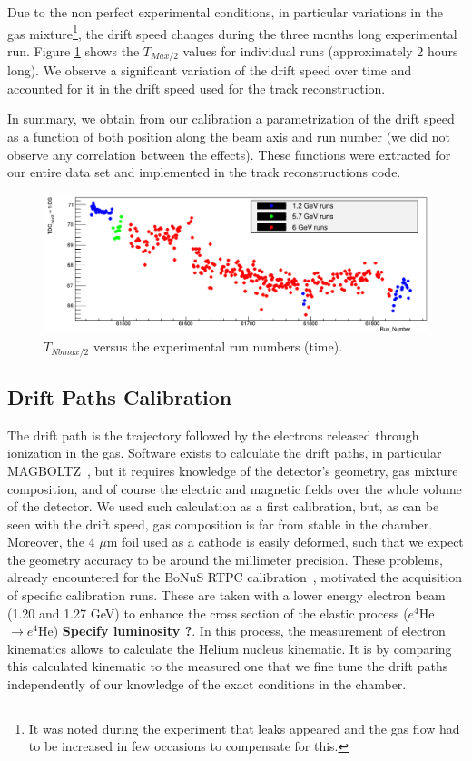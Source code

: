 \documentclass[twocolumn,showpacs,superscriptaddress,groupedaddress]{revtex4}
\begin{document}
Due to the non perfect experimental conditions, in particular variations in the 
gas mixture\footnote{It was noted during the experiment that leaks appeared
and the gas flow had to be increased in few occasions to compensate for this.}, 
the drift speed changes during the three months long experimental run.  
Figure \ref{fig:Drift_run_number_1} shows the $T_{Max/2}$ values for 
individual runs (approximately 2 hours long). We observe a significant 
variation of the drift speed over time and accounted for it in the drift 
speed used for the track reconstruction. 

In summary, we obtain from our calibration a parametrization of the drift speed 
as a function of both position along the beam axis and run number (we did not 
observe any correlation between the effects). These 
functions were extracted for our entire data set and implemented in the 
track reconstructions code.

\begin{figure}[tb]
\hspace*{-1.8cm}
\includegraphics[scale=0.26]{fig/Drift_run_number_1.png}
\caption{$T_{Nbmax/2}$ versus the experimental run numbers (time).  } 
\label{fig:Drift_run_number_1}
\end{figure}

   
\subsection{Drift Paths Calibration}

The drift path is the trajectory followed by the electrons released through 
ionization in the gas. Software exists to calculate the drift paths, in particular
MAGBOLTZ~\cite{MAGBOLTZ}, but it requires knowledge of the detector's 
geometry, gas mixture composition, and of course the electric and magnetic 
fields over the whole volume of the detector. We used such calculation as a 
first calibration, but, 
as can be seen with the drift speed, gas composition is far from stable in the 
chamber. Moreover, the 4 $\mu$m foil used as a cathode is easily deformed, such
that we expect the geometry accuracy to be around the millimeter precision. 
These problems, already 
encountered for the BoNuS RTPC calibration~\cite{BONUS-NIM}, motivated the 
acquisition of specific calibration runs. These are taken with a lower energy 
electron beam (1.20 and 1.27 GeV) to enhance the cross section of the elastic 
process ($e^{4}$He$\rightarrow e^{4}$He)
{\bf \color{red} Specify luminosity ?}. In this process, the measurement of
electron kinematics allows to calculate the Helium nucleus kinematic. It is
by comparing this calculated kinematic to the measured one that we fine tune
the drift paths independently of our knowledge of the exact conditions in the 
chamber.
\end{document}
